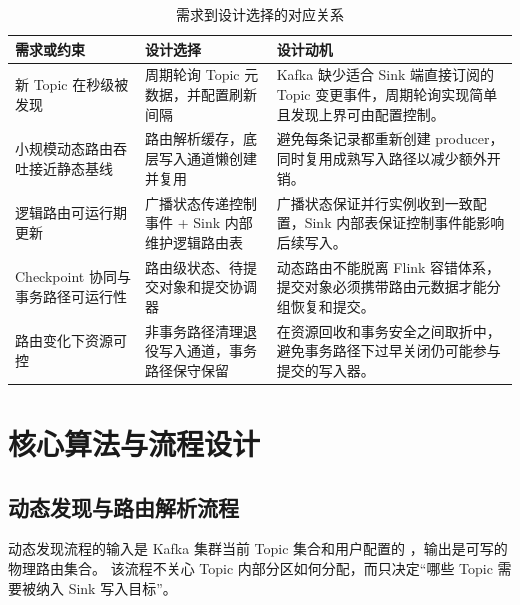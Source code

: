 \begin{table}[H]
  \centering
  \caption{需求到设计选择的对应关系}
  \label{tab:design-decisions}
  \small
  \setlength{\tabcolsep}{4pt}
  \renewcommand{\arraystretch}{1.18}
  \begin{tabularx}{0.97\textwidth}{>{\raggedright\arraybackslash}p{}>{\raggedright\arraybackslash}p{}>{\raggedright\arraybackslash}X}
    \toprule
    需求或约束 & 设计选择 & 设计动机 \\
    \midrule
    新 Topic 在秒级被发现 & 周期轮询 Topic 元数据，并配置刷新间隔 &
    Kafka 缺少适合 Sink 端直接订阅的 Topic 变更事件，周期轮询实现简单且发现上界可由配置控制。 \\
    小规模动态路由吞吐接近静态基线 & 路由解析缓存，底层写入通道懒创建并复用 &
    避免每条记录都重新创建 producer，同时复用成熟写入路径以减少额外开销。 \\
    逻辑路由可运行期更新 & 广播状态传递控制事件 + Sink 内部维护逻辑路由表 &
    广播状态保证并行实例收到一致配置，Sink 内部表保证控制事件能影响后续写入。 \\
    Checkpoint 协同与事务路径可运行性 & 路由级状态、待提交对象和提交协调器 &
    动态路由不能脱离 Flink 容错体系，提交对象必须携带路由元数据才能分组恢复和提交。 \\
    路由变化下资源可控 & 非事务路径清理退役写入通道，事务路径保守保留 &
    在资源回收和事务安全之间取折中，避免事务路径下过早关闭仍可能参与提交的写入器。 \\
    \bottomrule
  \end{tabularx}
\end{table}

\section{核心算法与流程设计}

\subsection{动态发现与路由解析流程}

动态发现流程的输入是 Kafka 集群当前 Topic 集合和用户配置的 ，输出是可写的物理路由集合。
该流程不关心 Topic 内部分区如何分配，而只决定“哪些 Topic 需要被纳入 Sink 写入目标”。

